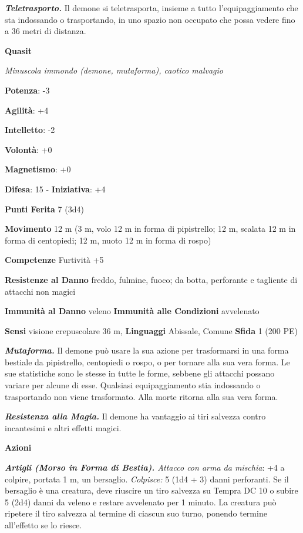 \begin{multicols}{2}
\emph{\textbf{Teletrasporto.}} Il demone si teletrasporta, insieme a
tutto l'equipaggiamento che sta indossando o trasportando, in uno spazio
non occupato che possa vedere fino a 36 metri di distanza.



\textbf{Quasit}

\emph{Minuscola immondo (demone, mutaforma), caotico malvagio}

\textbf{Potenza}: -3

\textbf{Agilità}: +4

\textbf{Intelletto}: -2

\textbf{Volontà}: +0

\textbf{Magnetismo}: +0

\textbf{Difesa}: 15 - \textbf{Iniziativa}: +4

\textbf{Punti Ferita} 7 (3d4)

\textbf{Movimento} 12 m (3 m, volo 12 m in forma di pipistrello; 12 m,
scalata 12 m in forma di centopiedi; 12 m, nuoto 12 m in forma di rospo)

\textbf{Competenze} Furtività +5

\textbf{Resistenze al Danno} freddo, fulmine, fuoco; da botta,
perforante e tagliente di attacchi non magici

\textbf{Immunità al Danno} veleno \textbf{Immunità alle Condizioni}
avvelenato

\textbf{Sensi} visione crepuscolare 36 m, 
\textbf{Linguaggi} Abissale, Comune \textbf{Sfida} 1 (200 PE)\smallskip

\emph{\textbf{Mutaforma.}} Il demone può usare la sua azione per
trasformarsi in una forma bestiale da pipistrello, centopiedi o rospo, o
per tornare alla sua vera forma. Le sue statistiche sono le stesse in
tutte le forme, sebbene gli attacchi possano variare per alcune di esse.
Qualsiasi equipaggiamento stia indossando o trasportando non viene
trasformato. Alla morte ritorna alla sua vera forma.

\emph{\textbf{Resistenza alla Magia.}} Il demone ha vantaggio ai tiri
salvezza contro incantesimi e altri effetti magici.

\smallskip\textbf{Azioni}

\emph{\textbf{Artigli (Morso in Forma di Bestia).} Attacco con arma da
mischia}: +4 a colpire, portata 1 m, un bersaglio. \emph{Colpisce:} 5
(1d4 + 3) danni perforanti. Se il bersaglio è una creatura, deve
riuscire un tiro salvezza su Tempra DC 10 o subire 5 (2d4) danni
da veleno e restare avvelenato per 1 minuto. La creatura può ripetere il
tiro salvezza al termine di ciascun suo turno, ponendo termine
all'effetto se lo riesce.


\end{multicols}
